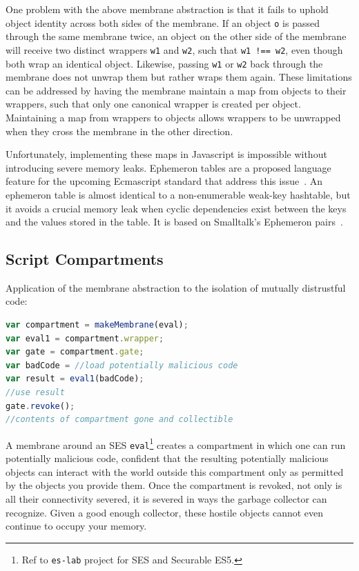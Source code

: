 \documentclass{acm_proc_article-sp}
\begin{document}
One problem with the above membrane abstraction is that it fails to uphold object identity across both sides of the membrane. If an object \texttt{o} is passed through the same membrane twice, an object on the other side of the membrane will receive two distinct wrappers \texttt{w1} and \texttt{w2}, such that \texttt{w1 !== w2}, even though both wrap an identical object. Likewise, passing \texttt{w1} or \texttt{w2} back through the membrane does not unwrap them but rather wraps them again. These limitations can be addressed by having the membrane maintain a map from objects to their wrappers, such that only one canonical wrapper is created per object. Maintaining a map from wrappers to objects allows wrappers to be unwrapped when they cross the membrane in the other direction.

Unfortunately, implementing these maps in Javascript is impossible without introducing severe memory leaks. Ephemeron tables are a proposed language feature for the upcoming Ecmascript standard that address this issue~\cite{miller10et}. An ephemeron table is almost identical to a non-enumerable weak-key hashtable, but it avoids a crucial memory leak when cyclic dependencies exist between the keys and the values stored in the table. It is based on Smalltalk's Ephemeron pairs~\cite{et_paper}.

\subsection{Script Compartments}

Application of the membrane abstraction to the isolation of mutually distrustful code:

\begin{lstlisting}[language=javascript]
var compartment = makeMembrane(eval);
var eval1 = compartment.wrapper;
var gate = compartment.gate;
var badCode = //load potentially malicious code
var result = eval1(badCode);
//use result
gate.revoke();
//contents of compartment gone and collectible
\end{lstlisting}

A membrane around an SES \texttt{eval}\footnote{Ref to \texttt{es-lab} project for SES and Securable ES5.} creates a compartment in which one can run potentially malicious code, confident that the resulting potentially malicious objects can interact with the world outside this compartment only as permitted by the objects you provide them. Once the compartment is revoked, not only is all their connectivity severed, it is severed in ways the garbage collector can recognize. Given a good enough collector, these hostile objects cannot even continue to occupy your memory.
\end{document}
